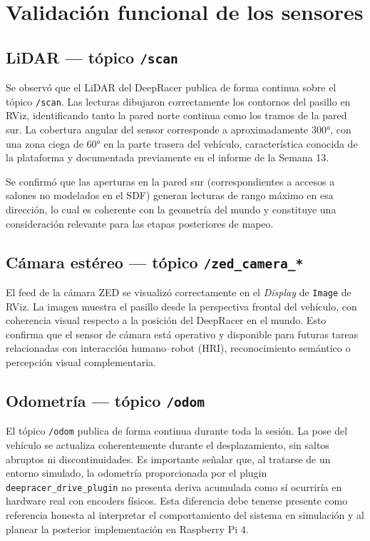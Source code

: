 \documentclass[12pt,letterpaper]{article}
\begin{document}
\section{Validación funcional de los sensores}

\subsection{LiDAR --- tópico \texttt{/scan}}

Se observó que el LiDAR del DeepRacer publica de forma continua sobre el tópico \texttt{/scan}. Las lecturas dibujaron correctamente los contornos del pasillo en RViz, identificando tanto la pared norte continua como los tramos de la pared sur. La cobertura angular del sensor corresponde a aproximadamente 300°, con una zona ciega de 60° en la parte trasera del vehículo, característica conocida de la plataforma y documentada previamente en el informe de la Semana 13.

Se confirmó que las aperturas en la pared sur (correspondientes a accesos a salones no modelados en el SDF) generan lecturas de rango máximo en esa dirección, lo cual es coherente con la geometría del mundo y constituye una consideración relevante para las etapas posteriores de mapeo.

\subsection{Cámara estéreo --- tópico \texttt{/zed\_camera\_*}}

El feed de la cámara ZED se visualizó correctamente en el \textit{Display} de \texttt{Image} de RViz. La imagen muestra el pasillo desde la perspectiva frontal del vehículo, con coherencia visual respecto a la posición del DeepRacer en el mundo. Esto confirma que el sensor de cámara está operativo y disponible para futuras tareas relacionadas con interacción humano--robot (HRI), reconocimiento semántico o percepción visual complementaria.

\subsection{Odometría --- tópico \texttt{/odom}}

El tópico \texttt{/odom} publica de forma continua durante toda la sesión. La pose del vehículo se actualiza coherentemente durante el desplazamiento, sin saltos abruptos ni discontinuidades. Es importante señalar que, al tratarse de un entorno simulado, la odometría proporcionada por el plugin \texttt{deepracer\_drive\_plugin} no presenta deriva acumulada como sí ocurriría en hardware real con encoders físicos. Esta diferencia debe tenerse presente como referencia honesta al interpretar el comportamiento del sistema en simulación y al planear la posterior implementación en Raspberry Pi 4.
\end{document}
